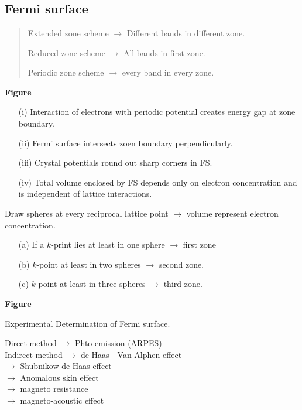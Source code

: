 \chapter[Lecture 24]{}\label{lec24}

\section*{Fermi surface}
\begin{quote}
Extended zone scheme $\to$ Different bands in different zone.

Reduced zone scheme $\to$ All bands in first zone.

Periodic zone scheme $\to$ every band in every zone.
\end{quote}
\begin{center}
{\bf Figure}
\end{center}
\begin{itemize}
\item[(i)] Interaction of electrons with periodic potential creates energy gap at zone boundary.

\item[(ii)] Fermi surface intersects zoen boundary perpendicularly.

\item[(iii)] Crystal potentials round out sharp corners in FS.

\item[(iv)] Total volume enclosed by FS depends only on electron concentration and is independent of lattice interactions.
\end{itemize}

Draw spheres at every reciprocal lattice point $\to$ volume represent electron concentration.
\begin{itemize}
\item[(a)] If a $k$-print lies at least in one sphere $\to$ first zone

\item[(b)] $k$-point at least in two spheres $\to$ second zone.

\item[(c)] $k$-point at least in three spheres $\to$ third zone.
\end{itemize}
\begin{center}
{\bf Figure}
\end{center}

Experimental Determination of Fermi surface.
\begin{tabbing}
\phantom{N}Direct method \=$\to$ Phto emission (ARPES)\\[4pt]
Indirect method \>$\to$ de Haas - Van Alphen effect\\[4pt]
                \>$\to$ Shubnikow-de Haas effect\\[4pt]
                \>$\to$ Anomalous skin effect\\[4pt]
                \>$\to$ magneto resistance\\[4pt]
                \>$\to$ magneto-acoustic effect
\end{tabbing}

